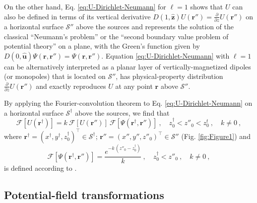 On the other hand, Eq. \ref{eq:U-Dirichlet-Neumann} for $\ell = 1$ shows that $U$ can also
be defined in terms of its vertical derivative 
$D(1, \hat{\mathbf{z}}) U(\mathbf{r}'') = \tfrac{\partial}{\partial z} U(\mathbf{r}'')$ 
on a horizontal surface $\mathcal{S}''$ above the sources and represents the solution of the classical ``Neumann’s problem'' or the 
``second boundary value problem of potential theory'' \citep[][p. 246]{kellogg1967} on a plane, 
with the Green's function given by $D(0, \hat{\mathbf{u}}) \Psi(\mathbf{r}, \mathbf{r}'') = \Psi(\mathbf{r}, \mathbf{r}'')$.
Equation \ref{eq:U-Dirichlet-Neumann} with $\ell = 1$ can be alternatively interpreted as a planar layer of
vertically-magnetized dipoles (or monopoles) that is located on $\mathcal{S}''$, has 
physical-property distribution $\tfrac{\partial}{\partial z} U(\mathbf{r}'')$ and exactly reproduces 
$U$ at any point $\mathbf{r}$ above $\mathcal{S}''$.

By applying the Fourier-convolution theorem \citep[][p. 268]{blakely1996} to Eq. \ref{eq:U-Dirichlet-Neumann} 
on a horizontal surface $\mathcal{S}^{\dagger}$ above the sources, we find that
\begin{equation}
	\mathcal{F} [ U(\mathbf{r}^{\dagger}) ] = 
	k \: \mathcal{F} [ U(\mathbf{r}'') ] \:
	\mathcal{F} [ \Psi(\mathbf{r}^{\dagger}, \mathbf{r}'') ] \: ,
	\quad z^{\dagger}_{0} < z''_{0} < z^{t}_{0} \: , \quad k \ne 0 \: ,
	\label{eq:U-Dirichlet-Neumann-Fourier}
\end{equation}
where $\mathbf{r}^{\dagger} = (x^{\dagger}, y^{\dagger}, z^{\dagger}_{0})^{\top} \in \mathcal{S}^{\dagger}$; 
$\mathbf{r}'' = (x'', y'', z''_{0})^{\top} \in \mathcal{S}''$ (Fig. \ref{fig:Figure1}) and
\begin{equation}
	\mathcal{F} [ \Psi(\mathbf{r}^{\dagger}, \mathbf{r}'') ] 
	= \frac{e^{- k \, (z''_{0} - z^{\dagger}_{0})}}{k}
	\: , \quad z^{\dagger}_{0} < z''_{0} \: , \quad k \ne 0 \: ,
	\label{eq:Psi-Fourier}
\end{equation}
is defined according to \citep[][p. 275]{blakely1996}.

\subsection{Potential-field transformations}
\label{subsec:potential_field_transformations}

